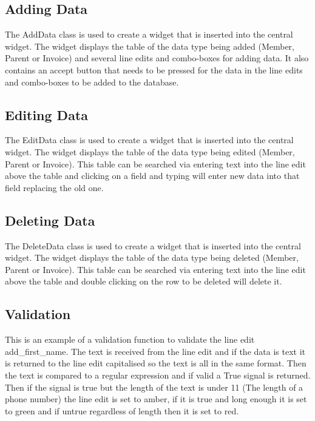\subsection{Adding Data}


The AddData class is used to create a widget that is inserted into the central widget. The widget displays the table of the data type being added (Member, Parent or Invoice) and several line edits and combo-boxes for adding data. It also contains an accept button that needs to be pressed for the data in the line edits and combo-boxes to be added to the database.


\subsection{Editing Data}


The EditData class is used to create a widget that is inserted into the central widget. The widget displays the table of the data type being edited (Member, Parent or Invoice). This table can be searched via entering text into the line edit above the table and clicking on a field and typing will enter new data into that field replacing the old one.


\subsection{Deleting Data}


The DeleteData class is used to create a widget that is inserted into the central widget. The widget displays the table of the data type being deleted (Member, Parent or Invoice). This table can be searched via entering text into the line edit above the table and double clicking on the row to be deleted will delete it.


\subsection{Validation}



This is an example of a validation function to validate the line edit add\_first\_name. The text is received from the line edit and if the data is text it is returned to the line edit capitalised so the text is all in the same format. Then the text is compared to a regular expression and if valid a True signal is returned. Then if the signal is true but the length of the text is under 11 (The length of a phone number) the line edit is set to amber, if it is true and long enough it is set to green and if untrue regardless of length then it is set to red.



